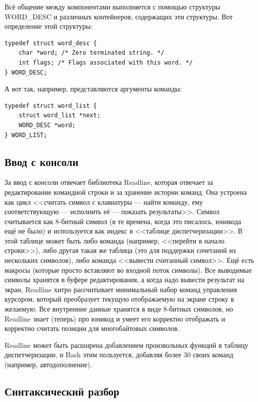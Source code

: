 \documentclass{../text-style}
\begin{document}
Всё общение между компонентами выполняется с помощью структуры WORD\_DESC и различных контейнеров, содержащих эти структуры. Вот определение этой структуры:

\begin{verbatim}
typedef struct word_desc {
    char *word; /* Zero terminated string. */
    int flags; /* Flags associated with this word. */
} WORD_DESC;
\end{verbatim}

А вот так, например, представляются аргументы команды:

\begin{verbatim}
typedef struct word_list {
    struct word_list *next;
    WORD_DESC *word;
} WORD_LIST;
\end{verbatim}

\subsection{Ввод с консоли}

За ввод с консоли отвечает библиотека Readline, которая отвечает за редактирование командной строки и за хранение истории команд. Она устроена как цикл <<считать символ с клавиатуры --- найти команду, ему соответствующую --- исполнить её --- показать результаты>>. Символ считывается как 8-битный символ (в те времена, когда это писалось, юникода ещё не было) и используется как индекс в <<таблице диспетчеризации>>. В этой таблице может быть либо команда (например, <<перейти в начало строки>>), либо другая такая же таблица (это для поддержки сочетаний из нескольких символов), либо команда <<вывести считанный символ>>. Ещё есть макросы (которые просто вставляют во входной поток символы). Все выводимые символы хранятся в буфере редактирования, а когда надо вывести результат на экран, Readline хитро рассчитывает минимальный набор команд управления курсором, который преобразует текущую отображаемую на экране строку в желаемую. Все внутренние данные хранятся в виде 8-битных символов, но Readline знает (теперь) про юникод и умеет его корректно отображать и корректно считать позиции для многобайтовых символов.

Readline может быть расширена добавлением произвольных функций в таблицу диспетчеризации, и Bash этим пользуется, добавляя более 30 своих команд (например, автодополнение).

\subsection{Синтаксический разбор}
\end{document}
